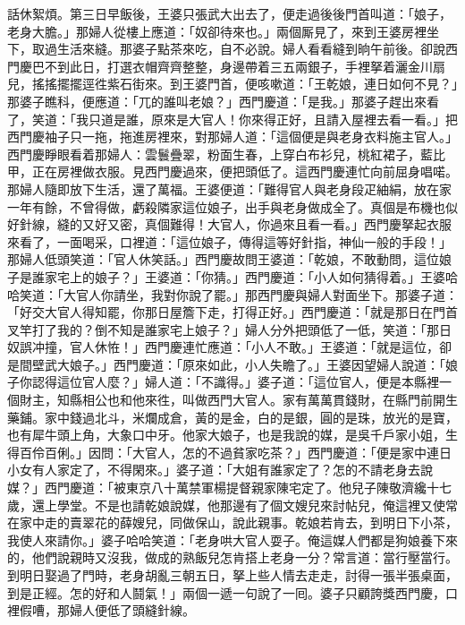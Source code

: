 話休絮煩。第三日早飯後，王婆只張武大出去了，便走過後後門首叫道：「娘子，老身大膽。」那婦人從樓上應道：「奴卻待來也。」兩個厮見了，來到王婆房裡坐下，取過生活來縫。那婆子點茶來吃，自不必說。婦人看看縫到晌午前後。卻說西門慶巴不到此日，{}打選衣帽齊齊整整，身邊帶着三五兩銀子，手裡拏着灑金川扇兒，搖搖擺擺逕徃紫石街來。到王婆門首，便咳嗽道：「王乾娘，連日如何不見？」那婆子瞧科，便應道：「兀的誰叫老娘？」西門慶道：「是我。」那婆子趕出來看了，笑道：「我只道是誰，原來是大官人！你來得正好，且請入屋裡去看一看。」把西門慶袖子只一拖，拖進房裡來，對那婦人道：「這個便是與老身衣料施主官人。」西門慶睜眼看着那婦人：雲鬟疊翠，粉面生春，上穿白布衫兒，桃紅裙子，藍比甲，正在房裡做衣服。見西門慶過來，便把頭低了。{}這西門慶連忙向前屈身唱喏。那婦人隨即放下生活，還了萬福。王婆便道：「難得官人與老身段疋紬絹，放在家一年有餘，不曾得做，虧殺隣家這位娘子，出手與老身做成全了。真個是布機也似好針線，縫的又好又密，真個難得！大官人，你過來且看一看。」西門慶拏起衣服來看了，一面喝采，口裡道：「這位娘子，傳得這等好針指，神仙一般的手段！」那婦人低頭笑道：「官人休笑話。」{}西門慶故問王婆道：「乾娘，不敢動問，這位娘子是誰家宅上的娘子？」王婆道：「你猜。」西門慶道：「小人如何猜得着。」王婆哈哈笑道：「大官人你請坐，我對你說了罷。」那西門慶與婦人對面坐下。那婆子道：「好交大官人得知罷，你那日屋簷下走，打得正好。」西門慶道：「就是那日在門首叉竿打了我的？倒不知是誰家宅上娘子？」婦人分外把頭低了一低，笑道：「那日奴誤冲撞，官人休恠！」{}西門慶連忙應道：「小人不敢。」王婆道：「就是這位，卻是間壁武大娘子。」西門慶道：「原來如此，小人失瞻了。」王婆因望婦人說道：「娘子你認得這位官人麼？」婦人道：「不識得。」婆子道：「這位官人，便是本縣裡一個財主，知縣相公也和他來徃，叫做西門大官人。家有萬萬貫錢財，在縣門前開生藥鋪。家中錢過北斗，米爛成倉，黃的是金，白的是銀，圓的是珠，放光的是寶，也有犀牛頭上角，大象口中牙。他家大娘子，也是我說的媒，是吳千戶家小姐，生得百伶百俐。」因問：「大官人，怎的不過貧家吃茶？」西門慶道：「便是家中連日小女有人家定了，不得閑來。」婆子道：「大姐有誰家定了？怎的不請老身去說媒？」西門慶道：「被東京八十萬禁軍楊提督親家陳宅定了。他兒子陳敬濟纔十七歲，還上學堂。不是也請乾娘說媒，他那邊有了個文嫂兒來討帖兒，俺這裡又使常在家中走的賣翠花的薛嫂兒，同做保山，說此親事。乾娘若肯去，到明日下小茶，我使人來請你。」婆子哈哈笑道：「老身哄大官人耍子。俺這媒人們都是狗娘養下來的，他們說親時又沒我，做成的熟飯兒怎肯搭上老身一分？常言道：當行壓當行。到明日娶過了門時，老身胡亂三朝五日，拏上些人情去走走，討得一張半張桌面，到是正經。怎的好和人鬪氣！」兩個一遞一句說了一囘。婆子只顧誇獎西門慶，口裡假嘈，那婦人便低了頭縫針線。

